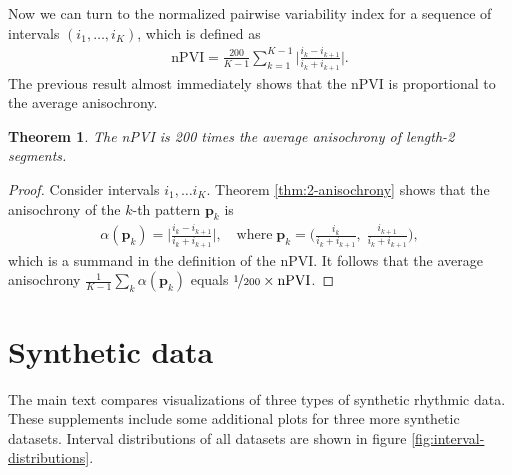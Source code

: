 \documentclass[a4paper]{article}
\newcommand{\vect}[1]{\mathbf{#1}}
\newcommand{\vp}{\vect p}
\newtheorem{theorem}{Theorem}
\theoremstyle{definition}
\begin{document}
Now we can turn to the normalized pairwise variability index for a sequence of intervals $(i_1, \dots, i_K)$, which is defined as
\begin{align}
  \text{nPVI}
  = \frac{200}{K-1} \sum_{k=1}^{K-1}
  \Big| \frac{i_k - i_{k+1}}{i_k + i_{k+1}} \Big|.
\end{align}
The previous result almost immediately shows that the nPVI is proportional to the average anisochrony.

\begin{theorem}
  The nPVI is 200 times the average anisochrony of length-2 segments.
\end{theorem}
\begin{proof}
  Consider intervals $i_1, \dots i_K$.
  Theorem \ref{thm:2-anisochrony} shows that the anisochrony of the $k$-th pattern $\vp_k$ is
  \begin{align}
    \alpha(\vp_k)
    = \Big|
    \frac{i_k - i_{k+1}}{i_k+i_{k+1}}
    \Big|,
    \quad \text{where}\;
    \vp_k = \Big(\frac{i_k}{i_k+i_{k+1}}, \;\frac{i_{k+1}}{i_k+i_{k+1}}\Big),
  \end{align}
  which is a summand in the definition of the nPVI.
  It follows that the average anisochrony $\tfrac{1}{K-1}\sum_k \alpha(\vp_k)$
  equals $\nicefrac{1}{200} \times \text{nPVI}$.
\end{proof}

\newpage

\section{Synthetic data}

The main text compares visualizations of three types of synthetic rhythmic data. These supplements include some additional plots for three more synthetic datasets.
Interval distributions of all datasets are shown in figure \ref{fig:interval-distributions}.
\end{document}

